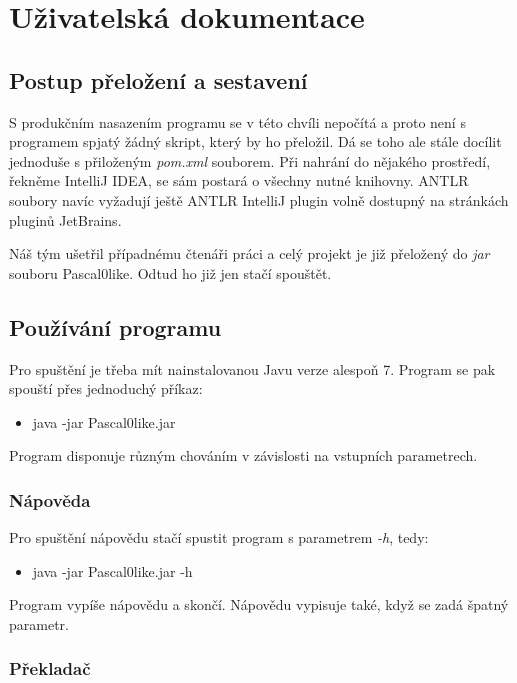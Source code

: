\documentclass[
12pt,
a4paper,
pdftex,
czech,
titlepage
]{report}
\begin{document}
\chapter{Uživatelská dokumentace} 

\section{Postup přeložení a sestavení}

S produkčním nasazením programu se v této chvíli nepočítá a proto není s programem spjatý žádný skript, který by ho přeložil. Dá se toho ale stále docílit jednoduše s přiloženým \textit{pom.xml} souborem. Při nahrání do nějakého prostředí, řekněme IntelliJ IDEA, se sám postará o všechny nutné knihovny. ANTLR soubory navíc vyžadují ještě ANTLR IntelliJ plugin volně dostupný na stránkách pluginů JetBrains. 

Náš tým ušetřil případnému čtenáři práci a celý projekt je již přeložený do \textit{jar} souboru Pascal0like. Odtud ho již jen stačí spouštět.

\section{Používání programu}

Pro spuštění je třeba mít nainstalovanou Javu verze alespoň 7. Program se pak spouští přes jednoduchý příkaz:
\begin{itemize}
\item java -jar Pascal0like.jar
\end{itemize}

Program disponuje různým chováním v závislosti na vstupních parametrech.

\subsection{Nápověda}

Pro spuštění nápovědu stačí spustit program s parametrem \textit{-h}, tedy:
\begin{itemize}
\item java -jar Pascal0like.jar -h
\end{itemize}
Program vypíše nápovědu a skončí. Nápovědu vypisuje také, když se zadá špatný parametr.

\subsection{Překladač}
\end{document}
